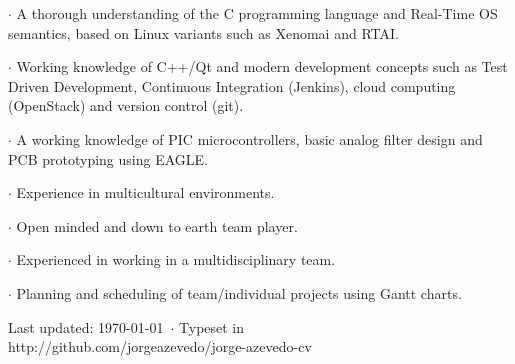 {
 $\cdot$ A thorough understanding of the C programming language and Real-Time OS
semantics, based on Linux variants such as Xenomai and RTAI.

 $\cdot$ Working knowledge of C++/Qt and modern development concepts such as
Test Driven Development, Continuous Integration (Jenkins), cloud computing
(OpenStack) and version control (git).
}
{
 $\cdot$ A working knowledge of PIC microcontrollers, basic analog filter design and PCB
prototyping using EAGLE.
}
{
 $\cdot$ Experience in multicultural environments. 

 $\cdot$ Open minded and down to earth team player.

}
{

 $\cdot$ Experienced in working in a multidisciplinary team.

 $\cdot$ Planning and scheduling of team/individual projects using Gantt charts.
}


\vfill

\begin{center}
{
    \scriptsize  Last updated: \today ~$\cdot$ Typeset in \XeLaTeX\\
    http://github.com/jorgeazevedo/jorge-azevedo-cv
}

\end{center}

